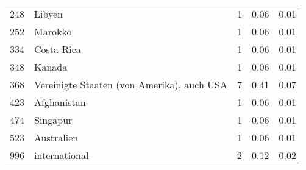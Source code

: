 \begin{longtable}{lXrrr}
        248 & \multicolumn{1}{X}{Libyen} & %
          \num{1} &
          \num[round-mode=places,round-precision=2]{0.06} &
          \num[round-mode=places,round-precision=2]{0.01} \\

        252 & \multicolumn{1}{X}{Marokko} & %
          \num{1} &
          \num[round-mode=places,round-precision=2]{0.06} &
          \num[round-mode=places,round-precision=2]{0.01} \\

        334 & \multicolumn{1}{X}{Costa Rica} & %
          \num{1} &
          \num[round-mode=places,round-precision=2]{0.06} &
          \num[round-mode=places,round-precision=2]{0.01} \\

        348 & \multicolumn{1}{X}{Kanada} & %
          \num{1} &
          \num[round-mode=places,round-precision=2]{0.06} &
          \num[round-mode=places,round-precision=2]{0.01} \\

        368 & \multicolumn{1}{X}{Vereinigte Staaten (von Amerika), auch USA} & %
          \num{7} &
          \num[round-mode=places,round-precision=2]{0.41} &
          \num[round-mode=places,round-precision=2]{0.07} \\

        423 & \multicolumn{1}{X}{Afghanistan} & %
          \num{1} &
          \num[round-mode=places,round-precision=2]{0.06} &
          \num[round-mode=places,round-precision=2]{0.01} \\

        474 & \multicolumn{1}{X}{Singapur} & %
          \num{1} &
          \num[round-mode=places,round-precision=2]{0.06} &
          \num[round-mode=places,round-precision=2]{0.01} \\

        523 & \multicolumn{1}{X}{Australien} & %
          \num{1} &
          \num[round-mode=places,round-precision=2]{0.06} &
          \num[round-mode=places,round-precision=2]{0.01} \\

        996 & \multicolumn{1}{X}{international} & %
          \num{2} &
          \num[round-mode=places,round-precision=2]{0.12} &
          \num[round-mode=places,round-precision=2]{0.02} \\


\end{longtable}
